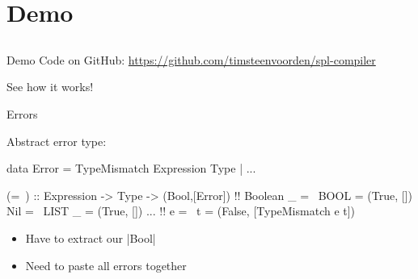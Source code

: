 \section{Demo}
\subsection*{}

\begin{frame}{Demo}
  Code on GitHub: \url{https://github.com/timsteenvoorden/spl-compiler}

  \bigskip

  See how it works!
\end{frame}

\appendix

\begin{frame}[fragile]{Errors}

  Abstract error type:

    \begin{code}
      data Error = TypeMismatch Expression Type | ...
    \end{code}
  
  \pause

  \begin{block}{}
    \begin{code}
      (=~) :: Expression -> Type -> (Bool,[Error]) !\pause!
      Boolean _ =~ BOOL   = (True, [])
      Nil       =~ LIST _ = (True, [])
      ... !\pause!
      e         =~ t      = (False, [TypeMismatch e t])
    \end{code}
  \end{block}

  \pause

  \begin{itemize}
    \item Have to extract our |Bool| \frownie
    \item Need to paste all errors together \frownie
  \end{itemize}

\end{frame}

